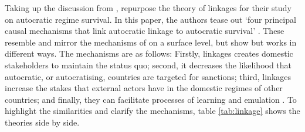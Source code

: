 Taking up the discussion from \citeauthor{levitsky_linkage_2006}, \citet{tansey_ties_2017} repurpose the theory of linkages for their study on autocratic regime survival. In this paper, the authors tease out `four principal causal mechanisms that link autocratic linkage to autocratic survival' \citep[p. 1225]{tansey_ties_2017}. These resemble and mirror the mechanisms of \citeauthor{levitsky_linkage_2006} on a surface level, but show but works in different ways. The mechanisms are as follows: Firstly, linkages creates domestic stakeholders to maintain the status quo; second, it decreases the likelihood that autocratic, or autocratising, countries are targeted for sanctions; third, linkages increase the stakes that external actors have in the domestic regimes of other countries; and finally, they can facilitate processes of learning and emulation \citep[pp. 1225-1227]{tansey_ties_2017}. To highlight the similarities and clarify the mechanisms, table \ref{tab:linkage} shows the theories side by side. 
